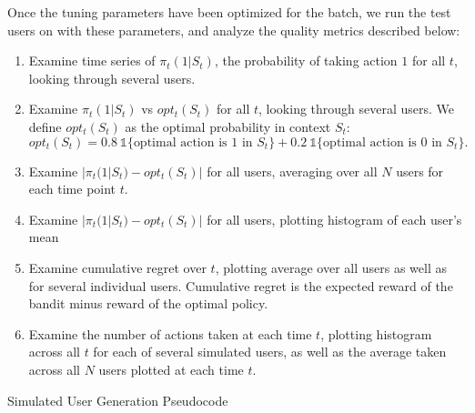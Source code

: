 Once the tuning parameters have been optimized for the batch, we run the test users on with these parameters, and analyze the quality metrics described below:

\begin{enumerate}
	\item Examine time series of $\pi_t(1 | S_t)$, the probability of taking action $1$ for all $t$, looking through several users.
	\item Examine $\pi_t(1 | S_t)$ vs $opt_t(S_t)$ for all $t$, looking through several users.
	\subitem We define $opt_t(S_t)$ as the optimal probability in context $S_t$:
	\begin{equation}
	\label{opt equation}
		opt_t(S_t) = 0.8\ \mathbb{1}\{\text{optimal action is $1$ in $S_t$}\} + 0.2\ \mathbb{1}\{\text{optimal action is $0$ in $S_t$}\} .
	\end{equation}
	\item Examine $|\pi_t(1 | S_t) - opt_t(S_t)|$ for all users, averaging over all $N$ users for each time point $t$.
	\item Examine $|\pi_t(1 | S_t) - opt_t(S_t)|$ for all users, plotting histogram of each user's mean
	\item Examine cumulative regret over $t$, plotting average over all users as well as for several individual users. 
	\subitem Cumulative regret is the expected reward of the bandit minus reward of the optimal policy.
	\item Examine the number of actions taken at each time $t$, plotting histogram across all $t$ for each of several simulated users, as well as the average taken across all $N$ users plotted at each time $t$.
\end{enumerate}



\begin{algorithm}[H]
\label{Simulated User Algorithm}
 \caption{Simulated User Generation Pseudocode}
\end{algorithm}